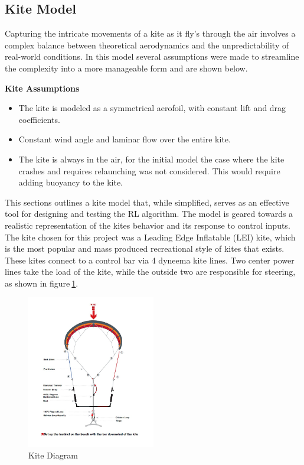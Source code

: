 \subsection{Kite Model}\label{sec:Kite}
Capturing the intricate movements of a kite as it fly's through the air involves a complex balance between theoretical aerodynamics and the unpredictability of real-world conditions. In this model several assumptions were made to streamline the complexity into a more manageable form and are shown below.

\textbf{Kite Assumptions}
\begin{itemize}
    \item The kite is modeled as a symmetrical aerofoil, with constant lift and drag coefficients.
    \item Constant wind angle and laminar flow over the entire kite.
    \item The kite is always in the air, for the initial model the case where the kite crashes and requires relaunching was not considered. This would require adding buoyancy to the kite.
\end{itemize}

This sections outlines a kite model that, while simplified, serves as an effective tool for designing and testing the RL algorithm. The model is geared towards a realistic representation of the kites behavior and its response to control inputs. The kite chosen for this project was a Leading Edge Inflatable (LEI) kite, which is the most popular and mass produced recreational style of kites that exists. These kites connect to a control bar via 4 dyneema kite lines. Two center power lines take the load of the kite, while the outside two are responsible for steering, as shown in figure$~$\ref{kite_diagram}.

\begin{figure}[h]
    \centering
    \includegraphics[width=0.5\textwidth]{Images/kitediagram.jpg}
    \caption{Kite Diagram}\label{kite_diagram}
\end{figure}

